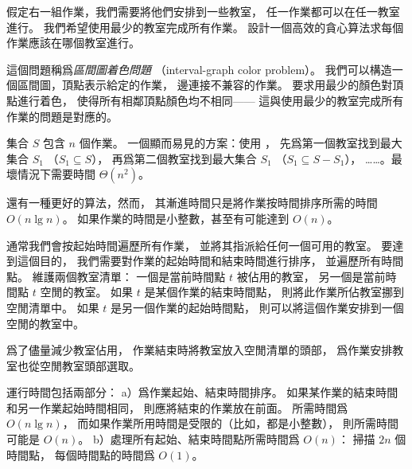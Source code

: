 \startEXERCISE
假定右一組作業，我們需要將他們安排到一些教室，
任一作業都可以在任一教室進行。
我們希望使用最少的教室完成所有作業。
設計一個高效的貪心算法求每個作業應該在哪個教室進行。

這個問題稱爲\emph{區間圖着色問題}
（interval-graph color problem）。
我們可以構造一個區間圖，頂點表示給定的作業，
邊連接不兼容的作業。
要求用最少的顏色對頂點進行着色，
使得所有相鄰頂點顏色均不相同——
這與使用最少的教室完成所有作業的問題是對應的。
\stopEXERCISE

\startANSWER
集合 $S$ 包含 $n$ 個作業。
一個顯而易見的方案：使用 ，
先爲第一個教室找到最大集合 $S_1$ （$S_1\subseteq S$），
再爲第二個教室找到最大集合 $S_1$ （$S_1\subseteq S - S_1$），
……。最壞情況下需要時間 $\Theta(n^2)$。

還有一種更好的算法，然而，
其漸進時間只是將作業按時間排序所需的時間 $O(n\lg n)$。
如果作業的時間是小整數，甚至有可能達到 $O(n)$。

通常我們會按起始時間遍歷所有作業，
並將其指派給任何一個可用的教室。
要達到這個目的，
我們需要對作業的起始時間和結束時間進行排序，
並遍歷所有時間點。
維護兩個教室清單：
一個是當前時間點 $t$ 被佔用的教室，
另一個是當前時間點 $t$ 空閒的教室。
如果 $t$ 是某個作業的結束時間點，
則將此作業所佔教室挪到空閒清單中。
如果 $t$ 是另一個作業的起始時間點，
則可以將這個作業安排到一個空閒的教室中。

爲了儘量減少教室佔用，
作業結束時將教室放入空閒清單的頭部，
爲作業安排教室也從空閒教室頭部選取。

運行時間包括兩部分：
 a）爲作業起始、結束時間排序。
如果某作業的結束時間和另一作業起始時間相同，
則應將結束的作業放在前面。
所需時間爲 $O(n\lg n)$，
而如果作業所用時間是受限的（比如，都是小整數），
則所需時間可能是 $O(n)$。
 b）處理所有起始、結束時間點所需時間爲 $O(n)$：
 掃描 $2n$ 個時間點，
 每個時間點的時間爲 $O(1)$。
\stopANSWER
